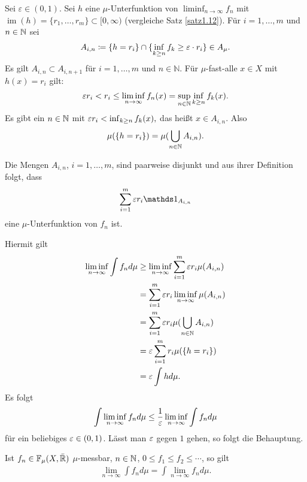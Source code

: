 \documentclass[a4paper,twoside,DIV15,BCOR12mm]{scrbook}
\newcommand{\ind}{\mathds 1}
\DeclareMathOperator{\im}{im}
\begin{document}
\begin{beweis}
Sei $\varepsilon \in (0,1)$. Sei $h$ eine $\mu$-Unterfunktion von $\liminf_{n\to\infty} f_n$ mit $\im(h) = \{r_1,\ldots,r_m\}\subset [0,\infty)$ (vergleiche Satz \ref{satz1.12}). Für $i=1,\ldots,m$ und $n\in\mathbb{N}$ sei 
\begin{align*}
A_{i,n}\da \{h=r_i\} \cap \{\inf_{k\ge n} f_k \ge \ep\cdot r_i\} \in A_\mu.
\end{align*}
Es gilt $A_{i,n}\subset A_{i,n+1}$ für $i=1,\ldots,m$ und $n\in\mathbb{N}$. Für $\mu$-fast-alle $x\in X$ mit $h(x) = r_i$ gilt:
\begin{align*}
\varepsilon r_i < r_i \le \liminf_{n\to\infty} f_n(x) = \sup_{n\in\mathbb{N}} \inf_{k\ge n} f_k(x).
\end{align*}
Es gibt ein $n\in\mathbb{N}$ mit $\varepsilon r_i < \inf_{k\ge n} f_k(x),$ das heißt $x\in A_{i,n}$. Also
\begin{align*}
\mu(\{h=r_i\}) = \mu(\bigcup_{n\in\mathbb{N}} A_{i,n}).
\end{align*}

Die Mengen $A_{i,n}$, $i=1,\ldots,m$, sind paarweise disjunkt und aus ihrer Definition folgt, dass
\begin{align*}
\sum_{i=1}^m \ep r_i \ind_{A_{i,n}}
\end{align*}
eine $\mu$-Unterfunktion von $f_n$ ist.

Hiermit gilt
\begin{align*}
\liminf_{n\to\infty} \int f_n d\mu 
&\ge \liminf_{n\to\infty} \sum_{i=1}^m \varepsilon r_i \mu(A_{i,n})\\
&= \sum_{i=1}^m \varepsilon r_i \liminf_{n\to\infty} \mu(A_{i,n})\\
&= \sum_{i=1}^m \varepsilon r_i \mu( \bigcup_{n\in\mathbb{N}} A_{i,n})\\
&= \varepsilon \sum_{i=1}^m r_i \mu(\{h=r_i\}) \\
&= \varepsilon \int hd\mu.
\end{align*}
Es folgt
\begin{align*}
\int \liminf_{n\to\infty} f_n d\mu \le \frac1{\varepsilon} \liminf_{n\to\infty} \int f_n d\mu
\end{align*}
für ein beliebiges $\varepsilon \in (0,1)$. Lässt man $\varepsilon$ gegen $1$ gehen, so folgt die Behauptung.
\end{beweis}

\begin{satz}
\label{satz1.16}
Ist $f_n\in\mathbb F_\mu(X,\bar{\mathbb{R}})$ $\mu$-messbar, $n\in\mathbb{N}$, $0\le f_1\le f_2\le \cdots$, so gilt
\begin{align*}
\lim_{n\to\infty} \int f_n d\mu = \int \lim_{n\to\infty} f_n  d\mu.
\end{align*}
\end{satz}
\end{document}
